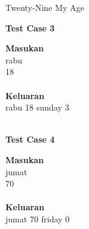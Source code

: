 \begin{permasalahan}{Twenty-Nine My Age}
	\begin{center}
	\textbf{Test Case 3}\\
	\end{center}
	\textbf{Masukan}\\
	rabu \\
	18 \\\\
	\textbf{Keluaran}\\
	rabu 18 sunday 3 \\\\
	
	\begin{center}
	\textbf{Test Case 4}\\
	\end{center}
	\textbf{Masukan}\\
	jumat \\
	70 \\\\
	\textbf{Keluaran}\\
	jumat 70 friday 0 \\	
\end{permasalahan}
